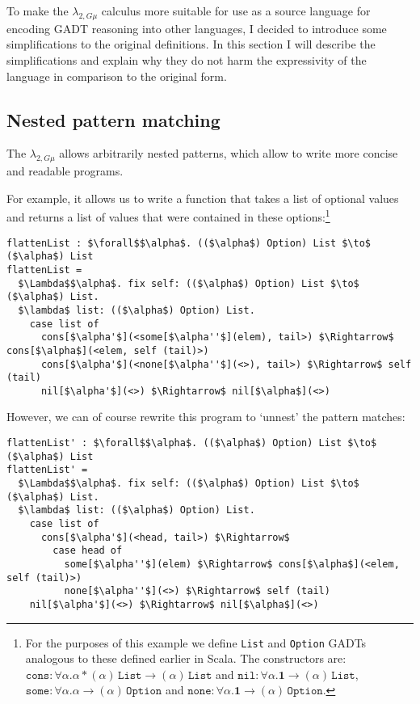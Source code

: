 To make the $\lambda_{2,G\mu}$ calculus more suitable for use as a source language for encoding GADT reasoning into other languages, I decided to introduce some simplifications to the original definitions. In this section I will describe the simplifications and explain why they do not harm the expressivity of the language in comparison to the original form.


\subsection{Nested pattern matching}

The $\lambda_{2,G\mu}$ allows arbitrarily nested patterns, which allow to write more concise and readable programs.

For example, it allows us to write a function that takes a list of optional values and returns a list of values that were contained in these options:\footnote{For the purposes of this example we define \texttt{List} and \texttt{Option} GADTs analogous to these defined earlier in Scala. The constructors are:\\
$\texttt{cons} : \forall \alpha. \alpha * (\alpha) \, \texttt{List} \to (\alpha) \, \texttt{List}$
and
$\texttt{nil} : \forall \alpha. \mathbf{1} \to (\alpha) \, \texttt{List}$,
\\
$\texttt{some} : \forall \alpha. \alpha \to (\alpha) \, \texttt{Option}$
and
$\texttt{none} : \forall \alpha. \mathbf{1} \to (\alpha) \, \texttt{Option}$.
}

\begin{lstlisting}[mathescape=true, basicstyle=\ttfamily]
flattenList : $\forall$$\alpha$. (($\alpha$) Option) List $\to$ ($\alpha$) List
flattenList = 
  $\Lambda$$\alpha$. fix self: (($\alpha$) Option) List $\to$ ($\alpha$) List.
  $\lambda$ list: (($\alpha$) Option) List.
    case list of
      cons[$\alpha'$](<some[$\alpha''$](elem), tail>) $\Rightarrow$ cons[$\alpha$](<elem, self (tail)>)
      cons[$\alpha'$](<none[$\alpha''$](<>), tail>) $\Rightarrow$ self (tail)
      nil[$\alpha'$](<>) $\Rightarrow$ nil[$\alpha$](<>)
\end{lstlisting}

However, we can of course rewrite this program to `unnest' the pattern matches:

\begin{lstlisting}[mathescape=true, basicstyle=\ttfamily]
flattenList' : $\forall$$\alpha$. (($\alpha$) Option) List $\to$ ($\alpha$) List
flattenList' = 
  $\Lambda$$\alpha$. fix self: (($\alpha$) Option) List $\to$ ($\alpha$) List.
  $\lambda$ list: (($\alpha$) Option) List.
    case list of
      cons[$\alpha'$](<head, tail>) $\Rightarrow$ 
        case head of
          some[$\alpha''$](elem) $\Rightarrow$ cons[$\alpha$](<elem, self (tail)>)
          none[$\alpha''$](<>) $\Rightarrow$ self (tail)
    nil[$\alpha'$](<>) $\Rightarrow$ nil[$\alpha$](<>)
\end{lstlisting}

